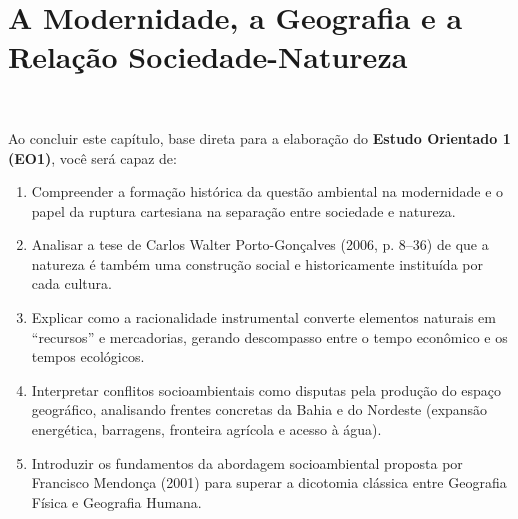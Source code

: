 
\chapter{A Modernidade, a Geografia e a Relação Sociedade-Natureza}
\noindent\tagEmenta\ \par\vspace{6pt}

\begin{capObjetivos}
Ao concluir este capítulo, base direta para a elaboração do \textbf{Estudo Orientado 1 (EO1)}, você será capaz de:
\begin{enumerate}[leftmargin=1.6em, itemsep=2.5pt]
  \item Compreender a formação histórica da questão ambiental na modernidade e o papel da ruptura cartesiana na separação entre sociedade e natureza.
  \item Analisar a tese de Carlos Walter Porto-Gonçalves (2006, p. 8--36) de que a natureza é também uma construção social e historicamente instituída por cada cultura.
  \item Explicar como a racionalidade instrumental converte elementos naturais em ``recursos'' e mercadorias, gerando descompasso entre o tempo econômico e os tempos ecológicos.
  \item Interpretar conflitos socioambientais como disputas pela produção do espaço geográfico, analisando frentes concretas da Bahia e do Nordeste (expansão energética, barragens, fronteira agrícola e acesso à água).
  \item Introduzir os fundamentos da abordagem socioambiental proposta por Francisco Mendonça (2001) para superar a dicotomia clássica entre Geografia Física e Geografia Humana.
\end{enumerate}
\end{capObjetivos}

